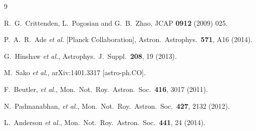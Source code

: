 \documentclass[prd,twocolumn,preprintnumbers,amsmath,amssymb,nofootinbib,english,showpacs]{revtex4-1}
\begin{document}
\begin{thebibliography}{9}

  R.~G.~Crittenden, L.~Pogosian and G.~B.~Zhao,
  JCAP {\bf 0912} (2009) 025.

  P.~A.~R.~Ade {\it et al.}  [Planck Collaboration],
  Astron.\ Astrophys.\  {\bf 571}, A16 (2014).

 G.~Hinshaw {\it et al.},  %
  Astrophys.\ J.\ Suppl.\  {\bf 208}, 19 (2013).

  M.~Sako {\it et al.},  %
  arXiv:1401.3317 [astro-ph.CO].

  F.~Beutler, {\it et al.},
  Mon.\ Not.\ Roy.\ Astron.\ Soc.\ {\bf 416}, 3017 (2011).

  N.~Padmanabhan, {\it et al.},
  Mon.\ Not.\ Roy.\ Astron.\ Soc.\ {\bf 427}, 2132 (2012).

 L.~Anderson {\it et al.},  %
  Mon.\ Not.\ Roy.\ Astron.\ Soc.\  {\bf 441}, 24 (2014).


\end{thebibliography}
\end{document}
